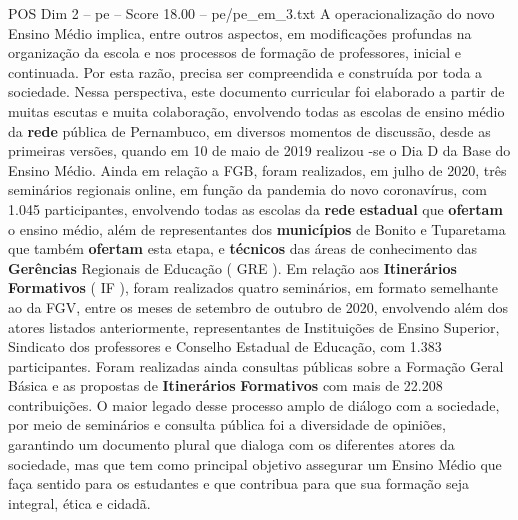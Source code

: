 \begin{textsample}{POS Dim 2 – pe – Score 18.00 – pe/pe\_em\_3.txt}
A operacionalização do novo Ensino Médio implica, entre outros aspectos, em modificações profundas na organização da escola e nos processos de formação de professores, inicial e continuada.
Por esta razão, precisa ser compreendida e construída por toda a sociedade.
Nessa perspectiva, este documento curricular foi elaborado a partir de muitas escutas e muita colaboração, envolvendo todas as escolas de ensino médio da \textbf{rede} pública de Pernambuco, em diversos momentos de discussão, desde as primeiras versões, quando em 10 de maio de 2019 realizou -se o Dia D da Base do Ensino Médio.
Ainda em relação a FGB, foram realizados, em julho de 2020, três seminários regionais online, em função da pandemia do novo coronavírus, com 1.045 participantes, envolvendo todas as escolas da \textbf{rede} \textbf{estadual} que \textbf{ofertam} o ensino médio, além de representantes dos \textbf{municípios} de Bonito e Tuparetama que também \textbf{ofertam} esta etapa, e \textbf{técnicos} das áreas de conhecimento das \textbf{Gerências} Regionais de Educação ( GRE ).
Em relação aos \textbf{Itinerários} \textbf{Formativos} ( IF ), foram realizados quatro seminários, em formato semelhante ao da FGV, entre os meses de setembro de outubro de 2020, envolvendo além dos atores listados anteriormente, representantes de Instituições de Ensino Superior, Sindicato dos professores e Conselho Estadual de Educação, com 1.383 participantes.
Foram realizadas ainda consultas públicas sobre a Formação Geral Básica e as propostas de \textbf{Itinerários} \textbf{Formativos} com mais de 22.208 contribuições.
O maior legado desse processo amplo de diálogo com a sociedade, por meio de seminários e consulta pública foi a diversidade de opiniões, garantindo um documento plural que dialoga com os diferentes atores da sociedade, mas que tem como principal objetivo assegurar um Ensino Médio que faça sentido para os estudantes e que contribua para que sua formação seja integral, ética e cidadã.

\end{textsample}
